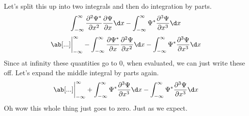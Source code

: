 Let's split this up into two integrals and then do integration by parts.
\begin{equation}
    \int_{-\infty}^{\infty}\pdv[order=2]{\Psi^*}{x}\pdv{\Psi}{x}\d x - \int_{-\infty}^{\infty}\Psi^*\pdv[order=3]{\Psi}{x}\d x
\end{equation}
\begin{equation}
    \ab[...]\evalat_{-\infty}^{\infty} - \int_{-\infty}^{\infty}\pdv{\Psi^*}{x}\pdv[order=2]{\Psi}{x}\d x - \int_{-\infty}^{\infty}\Psi^*\pdv[order=3]{\Psi}{x}\d x
\end{equation}
Since at infinity these quantities go to 0, when evaluated, we can just write these off. Let's expand the middle integral by parts again.
\begin{equation}
    \ab[...]\evalat_{-\infty}^{\infty} + \int_{-\infty}^{\infty}\Psi^*\pdv[order=3]{\Psi}{x}\d x - \int_{-\infty}^{\infty}\Psi^*\pdv[order=3]{\Psi}{x}\d x
\end{equation}
Oh wow this whole thing just goes to zero. Just as we expect.